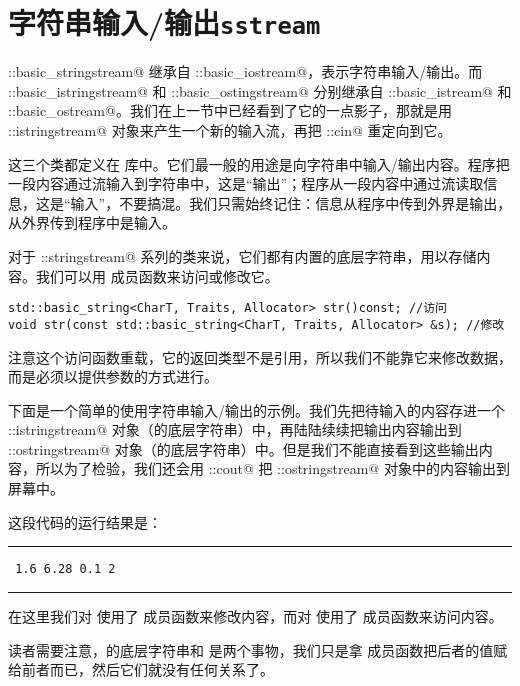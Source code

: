\section{字符串输入/输出\texttt{sstream}}
\lstinline@std::basic_stringstream@ 继承自 \lstinline@std::basic_iostream@，表示字符串输入/输出。而 \lstinline@std::basic_istringstream@ 和 \lstinline@std::basic_ostingstream@ 分别继承自 \lstinline@std::basic_istream@ 和 \lstinline@std::basic_ostream@。我们在上一节中已经看到了它的一点影子，那就是用 \lstinline@std::istringstream@ 对象来产生一个新的输入流，再把 \lstinline@std::cin@ 重定向到它。\par
这三个类都定义在 \lstinline@sstream@ 库中。它们最一般的用途是向字符串中输入/输出内容。程序把一段内容通过流输入到字符串中，这是``输出''；程序从一段内容中通过流读取信息，这是``输入''，不要搞混。我们只需始终记住：信息从程序中传到外界是输出，从外界传到程序中是输入。\par
对于 \lstinline@std::stringstream@ 系列的类来说，它们都有内置的底层字符串，用以存储内容。我们可以用 \lstinline@str@ 成员函数来访问或修改它。
\begin{lstlisting}
std::basic_string<CharT, Traits, Allocator> str()const; //访问
void str(const std::basic_string<CharT, Traits, Allocator> &s); //修改
\end{lstlisting}\par
注意这个访问函数重载，它的返回类型不是引用，所以我们不能靠它来修改数据，而是必须以提供参数的方式进行。\par
下面是一个简单的使用字符串输入/输出的示例。我们先把待输入的内容存进一个 \lstinline@std::istringstream@ 对象（的底层字符串）中，再陆陆续续把输出内容输出到 \lstinline@std::ostringstream@ 对象（的底层字符串）中。但是我们不能直接看到这些输出内容，所以为了检验，我们还会用 \lstinline@std::cout@ 把 \lstinline@std::ostringstream@ 对象中的内容输出到屏幕中。\par

这段代码的运行结果是：\\\noindent\rule{\linewidth}{.2pt}\texttt{
1.6 6.28 0.1 2
}\\\noindent\rule{\linewidth}{.2pt}\par
在这里我们对 \lstinline@sin@ 使用了 \lstinline@str@ 成员函数来修改内容，而对 \lstinline@sout@ 使用了 \lstinline@str@ 成员函数来访问内容。\par
读者需要注意，\lstinline@sin@ 的底层字符串和 \lstinline@input@ 是两个事物，我们只是拿 \lstinline@str@ 成员函数把后者的值赋给前者而已，然后它们就没有任何关系了。
